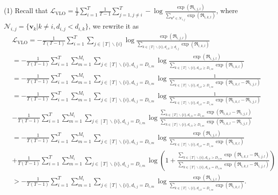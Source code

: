 (1) Recall that $\mathcal{L}_{\mathrm{VLO}}=\frac{1}{T}\sum\limits_{i=1}^T\frac{1}{T-1} \sum\limits_{j=1, j \neq i}^{T}-\log \frac{\exp\left(\mathfrak{R}_{i,j,l}\right)}{\sum\limits_{\mathbf{v}^k \in \mathcal{N}_{i, j}} \exp \left(\mathfrak{R}_{i,k,l}\right)}$, where $\mathcal{N}_{i, j}=\{\mathbf{v}_k | k \neq i , d_{i,j}<d_{i,k}\}$, we rewrite it as 
\begin{equation}
\begin{aligned}
& \mathcal{L}_{\mathrm{VLO}}=-\frac{1}{T(T-1)} \sum\limits_{i=1}^{T} \sum\limits_{j \in[T] \backslash\{i\}} \log \frac{\exp \left(\mathfrak{R}_{i, j,l}\right)}{\sum\limits_{k \in[T] \backslash\{i\}, d_{i, k} \geq d_{i, j}} \exp \left(\mathfrak{R}_{i, k,l}\right)} \\
& =-\frac{1}{T(T-1)} \sum\limits_{i=1}^{T} \sum\limits_{m=1}^{M_i} \sum\limits_{j \in[T] \backslash\{i\}, d_{i, j}=D_{i, m}} \log \frac{\exp \left(\mathfrak{R}_{i, j,l}\right)}{\sum\limits_{k \in[T] \backslash\{i\}, d_{i, k} \geq D_{i, m}} \exp \left(\mathfrak{R}_{i, k,l}\right)} \\
& =-\frac{1}{T(T-1)} \sum\limits_{i=1}^{T} \sum\limits_{m=1}^{M_i} \sum\limits_{j \in[T] \backslash\{i\}, d_{i, j}=D_{i, m}} \log \frac{1}{\sum\limits_{k \in[T] \backslash\{i\}, d_{i, k} \geq D_{i, m}} \exp \left(\mathfrak{R}_{i, k,l}-\mathfrak{R}_{i, j,l}\right)} \\
& =-\frac{1}{T(T-1)} \sum\limits_{i=1}^{T} \sum\limits_{m=1}^{M_i} \sum\limits_{j \in[T] \backslash\{i\}, d_{i, j}=D_{i, m}} \log \frac{1}{\sum\limits_{k \in[T] \backslash\{i\}, d_{i, k}=D_{i, m}} \exp \left(\mathfrak{R}_{i, k,l}-\mathfrak{R}_{i, j,l}\right)} \\
& -\frac{1}{T(T-1)} \sum\limits_{i=1}^{T} \sum\limits_{m=1}^{M_i} \sum\limits_{j \in[T] \backslash\{i\}, d_{i, j}=D_{i, m}} \log \frac{\sum\limits_{k \in[T] \backslash\{i\}, d_{i, k}=D_{i, m}} \exp \left(\mathfrak{R}_{i, k,l}-\mathfrak{R}_{i,j,l}\right)}{\sum\limits_{k \in[T] \backslash\{i\}, d_{i, k}\geq D_{i, m}} \exp \left(\mathfrak{R}_{i, k,l}-\mathfrak{R}_{i,j,l}\right)} \\
& =-\frac{1}{T(T-1)} \sum\limits_{i=1}^{T} \sum\limits_{m=1}^{M_i} \sum\limits_{j \in[T] \backslash\{i\}, d_{i, j}=D_{i, m}} \log \frac{\exp \left(\mathfrak{R}_{i, j,l}\right)}{\sum\limits_{k \in[T] \backslash\{i\}, d_{i, k}=D_{i, m}} \exp \left(\mathfrak{R}_{i, k,l}\right)} \\
& +\frac{1}{T(T-1)} \sum\limits_{i=1}^{T} \sum\limits_{m=1}^{M_i} \sum\limits_{j \in[T] \backslash\{i\}, d_{i, j}=D_{i, m}} \log \left(1+\frac{\sum\limits_{k \in[T] \backslash\{i\}, d_{i, k}>D_{i, m}} \exp \left(\mathfrak{R}_{i, k,l}-\mathfrak{R}_{i, j,l}\right)}{\sum\limits_{k \in[T] \backslash\{i\}, d_{i, k}=D_{i, m}} \exp \left(\mathfrak{R}_{i, k,l}-\mathfrak{R}_{i, j,l}\right)}\right) \\
& >-\frac{1}{T(T-1)} \sum\limits_{i=1}^{T} \sum\limits_{m=1}^{M_i} \sum\limits_{j \in[T] \backslash\{i\}, d_{i, j}=D_{i, m}} \log \frac{\exp \left(\mathfrak{R}_{i, j,l}\right)}{\sum\limits_{k \in[T] \backslash\{i\}, d_{i, k}=D_{i, m}} \exp \left(\mathfrak{R}_{i, k,l}\right)} .
\end{aligned}
\label{eq:A11}
\end{equation}


